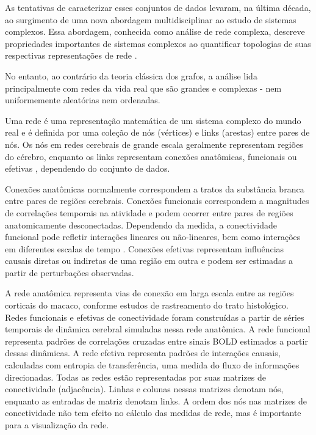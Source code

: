 \documentclass[
	12pt,				%
	openright,			%
	twoside,			%
	a4paper,			%
	english,			%
	french,				%
	spanish,			%
	brazil				%
	]{abntex2}
\begin{document}
As tentativas de caracterizar esses conjuntos de dados levaram, na última década, ao surgimento de uma nova abordagem multidisciplinar ao estudo de sistemas complexos. Essa abordagem, conhecida como análise de rede complexa, descreve propriedades importantes de sistemas complexos ao quantificar topologias de suas respectivas representações de rede \cite{sporns2010networks}.

 No entanto, ao contrário da teoria clássica dos grafos, a análise lida principalmente com redes da vida real que são grandes e complexas - nem uniformemente aleatórias nem ordenadas.

Uma rede é uma representação matemática de um sistema complexo do mundo real e é definida por uma coleção de nós (vértices) e links (arestas) entre pares de nós. Os nós em redes cerebrais de grande escala geralmente representam regiões do cérebro, enquanto os links representam conexões anatômicas, funcionais ou efetivas \cite{friston1994functional}, dependendo do conjunto de dados.

Conexões anatômicas normalmente correspondem a tratos da substância branca entre pares de regiões cerebrais. Conexões funcionais correspondem a magnitudes de correlações temporais na atividade e podem ocorrer entre pares de regiões anatomicamente desconectadas. Dependendo da medida, a conectividade funcional pode refletir interações lineares ou não-lineares, bem como interações em diferentes escalas de tempo \cite{zhou2009statistical}. Conexões efetivas representam influências causais diretas ou indiretas de uma região em outra e podem ser estimadas a partir de perturbações observadas.

A rede anatômica representa vias de conexão em larga escala entre as regiões corticais do macaco, conforme estudos de rastreamento do trato histológico. Redes funcionais e efetivas de conectividade foram construídas a partir de séries temporais de dinâmica cerebral simuladas nessa rede anatômica. A rede funcional representa padrões de correlações cruzadas entre sinais BOLD estimados a partir dessas dinâmicas. A rede efetiva representa padrões de interações causais, calculadas com entropia de transferência, uma medida do fluxo de informações direcionadas. Todas as redes estão representadas
por suas matrizes de conectividade (adjacência). Linhas e colunas nessas matrizes denotam nós, enquanto as entradas de matriz denotam links. A ordem dos nós nas matrizes de conectividade não tem efeito no cálculo das medidas de rede, mas é importante para a visualização da rede.
\end{document}
